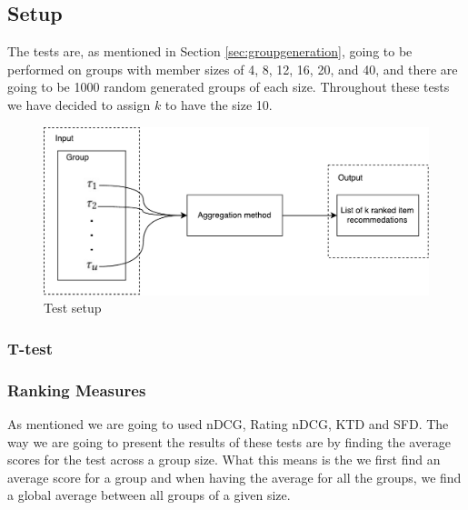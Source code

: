 \subsection{Setup}\label{sec:setup}
The tests are, as mentioned in Section \ref{sec:groupgeneration}, going to be performed on groups with member sizes of 4, 8, 12, 16, 20, and 40, and there are going to be 1000 random generated groups of each size. Throughout these tests we have decided to assign $k$ to have the size 10.  
\begin{figure}[h]
\centering
\includegraphics[scale=.4]{graphics/setup}
\caption{Test setup}\label{fig:composition}
\end{figure}
\subsubsection{T-test}

\subsubsection{Ranking Measures}
As mentioned we are going to used nDCG, Rating nDCG, KTD and SFD. The way we are going to present the results of these tests are by finding the average scores for the test across a group size. What this means is the we first find an average score for a group and when having the average for all the groups, we find a global average between all groups of a given size. 